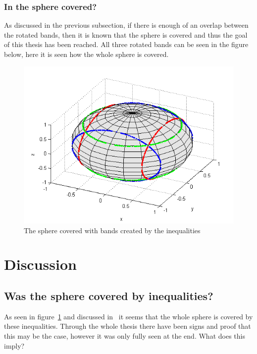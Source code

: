 \documentclass[
  utf8,%
  parskip,%
  largesmallcaps,intlimits,widermath,%
  sharecounter,nobreak,definition=marks,%
  noparts%
]{rtthesis}
\begin{document}
\subsection{In the sphere covered?}\label{Is the sphere covered?}
As discussed in the previous subsection, if there is enough of an overlap between the rotated bands, then it is known that the sphere is covered and thus the goal of this thesis has been reached.
All three rotated bands can be seen in the figure below, here it is seen how the whole sphere is covered.
\begin{figure}[H]
\begin{center}
\includegraphics[scale=0.9]{coveredsphere.png}
\caption{The sphere covered with bands created by the inequalities}
\label{fig:coveredsphere}
\end{center}
\end{figure}

\chapter{Discussion}\label{cha:discussion}
\newpage
\section{Was the sphere covered by inequalities?}
As seen in figure~\ref{fig:coveredsphere} and discussed in~ it seems that the whole sphere is covered by these inequalities. Through the whole thesis there have been signs and proof that this may be the case, however it was only fully seen at the end. What does this imply? 
\end{document}
